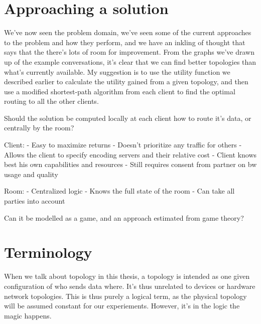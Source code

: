 

\section{Approaching a solution}

We've now seen the problem domain, we've seen some of the current approaches to the problem and how they perform, and we have an inkling of thought that says that the there's lots of room for improvement. From the graphs we've drawn up of the example conversations, it's clear that we can find better topologies than what's currently available. My suggestion is to use the utility function we described earlier to calculate the utility gained from a given topology, and then use a modified shortest-path algorithm from each client to find the optimal routing to all the other clients.

Should the solution be computed locally at each client how to route it's data, or centrally by the room?

    Client:
        - Easy to maximize returns
        - Doesn't prioritize any traffic for others
        - Allows the client to specify encoding servers and their relative cost
        - Client knows best his own capabilities and resources
        - Still requires consent from partner on bw usage and quality

    Room:
        - Centralized logic
        - Knows the full state of the room
        - Can take all parties into account

Can it be modelled as a game, and an approach estimated from game theory?

\section{Terminology}

When we talk about topology in this thesis, a topology is intended as one given configuration of who sends data where. It's thus unrelated to devices or hardware network topologies.  This is thus purely a logical term, as the physical topology will be assumed constant for our experiements. However, it's in the logic the magic happens.
